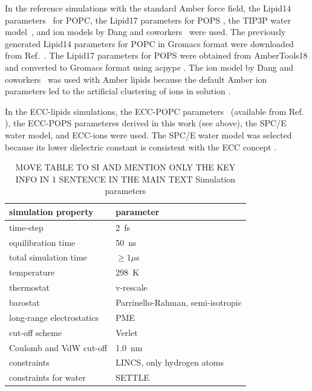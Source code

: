 \documentclass[journal=jpcbfk,manuscript=article]{achemso}
\begin{document}
In the reference simulations with the standard Amber force field,
the Lipid14 parameters~\cite{dickson14} for POPC, the Lipid17 parameters for POPS \cite{lipid17-future},
the TIP3P water model~\cite{jorgensen83}, and ion models by Dang and coworkers~\cite{smith94,chang1999,dang2006} were used.
The previously generated \cite{botan15} Lipid14 parameters for POPC in Gromacs format were downloaded from Ref.~. 
The Lipid17 parameters for POPS were obtained from AmberTools18 \cite{amber18} 
and converted to Gromacs format using acpype \cite{acpype}.  
The ion model by Dang and coworkers~\cite{smith94,chang1999,dang2006} was used with Amber lipids because
the default Amber ion parameters \cite{aqvist90} led to the artificial clustering of ions in solution \cite{NMRlipidsIV}.

In the ECC-lipids simulations,
the ECC-POPC parameters~\cite{melcr18} (available from Ref. ), 
the ECC-POPS parameteres derived in this work (see above), 
the SPC/E~\cite{Berendsen1987} water model, and ECC-ions \cite{martinek17, kohagen16, Pluharova2014} were used.
The SPC/E water model was selected because its lower dielectric constant is consistent with the
ECC concept \cite{leontyev11,leontyev14}.
\begin{table}[tbp]
  \caption{MOVE TABLE TO SI AND MENTION ONLY THE KEY INFO IN 1 SENTENCE IN THE MAIN TEXT  %
Simulation parameters}
  \label{tbl:mdpar}
  \begin{tabular}{ll}
    simulation property & parameter   \\
    \hline
    time-step           & 2~fs         \\
    equilibration time  & 50~ns  \\
    total simulation time     & $\geq 1 \mu$s  \\
    temperature         & 298~K       \\
    thermostat          & v-rescale  \cite{bussi07}   \\
    barostat            & Parrinello-Rahman, semi-isotropic \cite{parrinello81} \\
    long-range electrostatics & PME  \cite{darden93}  \\
    cut-off scheme      & Verlet \cite{Pall13}      \\
    Coulomb and VdW cut-off & 1.0~nm \\
    constraints         & LINCS, only hydrogen atoms \cite{hess97} \\
    constraints for water & SETTLE  \cite{miyamoto92} \\
    \hline
  \end{tabular}
\end{table}
 
\end{document}
